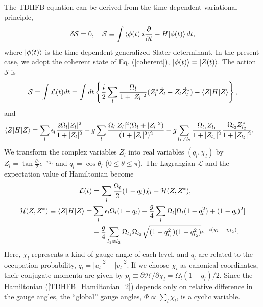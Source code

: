 \documentclass[%
superscriptaddress,
preprint,
showpacs,
nofootinbib,
amsmath,amssymb,
aps,
prc,
floatfix ]%
{revtex4-1}
\begin{document}
The TDHFB equation can be derived from the time-dependent variational
principle,
\begin{equation}
	\delta \mathcal{S} = 0,
	\quad
	\mathcal{S}\equiv
	\int \braket{\phi(t)|i\frac{\partial}{\partial t}-H|\phi(t)}dt,
  \label{TDHFB}
\end{equation}
where $\ket{\phi(t)}$ is the time-dependent generalized Slater determinant.
In the present case, we adopt the coherent state of Eq. (\ref{coherent}),
$\ket{\phi(t)}=\ket{Z(t)}$.
The action $\mathcal{S}$ is
\begin{equation}
	\mathcal{S}  = \int \mathcal{L}(t) dt
	= \int dt \left\{ \frac{i}{2} \sum_l \frac{\Omega_l}{1+|Z_l|^2}
  (Z_l^*\dot{Z_l}-Z_l\dot{Z_l^*}) - \braket{Z|H|Z} \right\} ,
\label{S}
\end{equation}
and
\begin{align}
  \braket{Z|H|Z} &= \sum_l \epsilon_l \frac{2\Omega_l |Z_l|^2}{1+|Z_l|^2}
  -g \sum_l \frac{\Omega_l|Z_l|^2(\Omega_l+|Z_l|^2)}{(1+|Z_l|^2)^2}
  -g \sum_{l_1 \neq l_2} \frac{\Omega_{l_1}Z_{l_1}}{1+|Z_{l_1}|^2}\frac{\Omega_{l_2}Z_{l_2}^*}{1+|Z_{l_2}|^2}.
	\label{TDHFB_Hamiltonian_1}
\end{align}
We transform the complex variables $Z_l$ into real variables $(q_l,\chi_l)$
by $Z_l = \tan{\frac{\theta_l}{2}}e^{-i\chi_l}$ and $q_l=\cos{\theta_l}$ ($0\leq\theta\leq\pi$).
The Lagrangian $\mathcal{L}$ and the expectation value of Hamiltonian become
\begin{align}
\mathcal{L}(t) &= \sum_l \frac{\Omega_l}{2}
	(1-q_l)\dot{\chi_l} - \mathcal{H}(Z,Z^*) ,\\
	\mathcal{H}(Z,Z^*) \equiv \braket{Z|H|Z} =& \sum_l \epsilon_l\Omega_l(1- q_l) - \frac{g}{4}\sum_l \Omega_l [\Omega_l(1-q_l^2)+(1-q_l)^2] \nonumber \\
&- \frac{g}{4}\sum_{l_1\neq l_2} \Omega_{l_1}\Omega_{l_2}\sqrt{(1-q_{l_1}^2)(1-q_{l_2}^2)}e^{-i(\chi_{l_1}-\chi_{l_2})}   .
\label{TDHFB_Hamiltonian_2}
\end{align}
Here, $\chi_l$ represents a kind of gauge angle of each level,
and $q_l$ are related to the occupation probability, $q_l=|u_l|^2-|v_l|^2$.
If we choose $\chi_l$ as canonical coordinates, their conjugate momenta
are given by
$p_l\equiv \partial\mathcal{H}/\partial\dot{\chi}_l=\Omega_l(1-q_l)/2$.
Since the Hamiltonian (\ref{TDHFB_Hamiltonian_2}) depends only on
relative difference in the gauge angles,
the ``global'' gauge angles, $\Phi\propto\sum_l \chi_l$,
is a cyclic variable.
\end{document}
